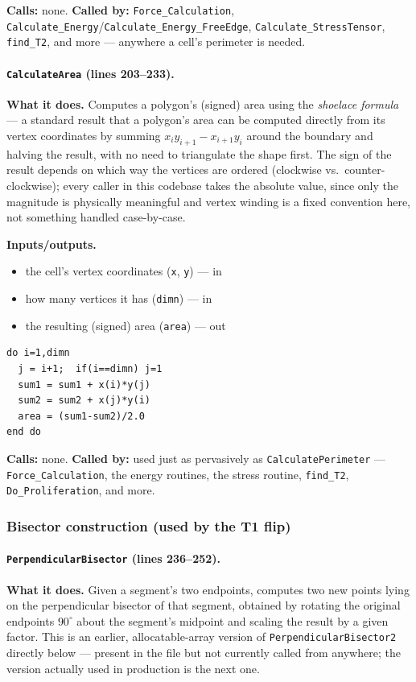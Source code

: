 \documentclass[11pt]{article}
\begin{document}
\textbf{Calls:} none. \textbf{Called by:} \texttt{Force\_Calculation},
\texttt{Calculate\_Energy}/\texttt{Calculate\_Energy\_FreeEdge},
\texttt{Calculate\_StressTensor}, \texttt{find\_T2}, and more --- anywhere a cell's
perimeter is needed.

\paragraph{\texttt{CalculateArea} (lines 203--233).}
\textbf{What it does.} Computes a polygon's (signed) area using the \emph{shoelace
formula} --- a standard result that a polygon's area can be computed directly from its
vertex coordinates by summing $x_i y_{i+1} - x_{i+1} y_i$ around the boundary and
halving the result, with no need to triangulate the shape first. The sign of the result
depends on which way the vertices are ordered (clockwise vs.\ counter-clockwise); every
caller in this codebase takes the absolute value, since only the magnitude is
physically meaningful and vertex winding is a fixed convention here, not something
handled case-by-case.

\textbf{Inputs/outputs.}
\begin{itemize}[nosep]
  \item the cell's vertex coordinates (\texttt{x}, \texttt{y}) --- in
  \item how many vertices it has (\texttt{dimn}) --- in
  \item the resulting (signed) area (\texttt{area}) --- out
\end{itemize}

\begin{lstlisting}[caption={The shoelace-formula accumulation in \texttt{CalculateArea}.}]
do i=1,dimn
  j = i+1;  if(i==dimn) j=1
  sum1 = sum1 + x(i)*y(j)
  sum2 = sum2 + x(j)*y(i)
  area = (sum1-sum2)/2.0
end do
\end{lstlisting}

\textbf{Calls:} none. \textbf{Called by:} used just as pervasively as
\texttt{CalculatePerimeter} --- \texttt{Force\_Calculation}, the energy routines, the
stress routine, \texttt{find\_T2}, \texttt{Do\_Proliferation}, and more.

\subsubsection*{Bisector construction (used by the T1 flip)}

\paragraph{\texttt{PerpendicularBisector} (lines 236--252).}
\textbf{What it does.} Given a segment's two endpoints, computes two new points lying
on the perpendicular bisector of that segment, obtained by rotating the original
endpoints $90^\circ$ about the segment's midpoint and scaling the result by a given
factor. This is an earlier, allocatable-array version of \texttt{PerpendicularBisector2}
directly below --- present in the file but not currently called from anywhere; the
version actually used in production is the next one.
\end{document}
